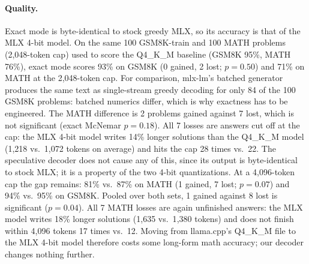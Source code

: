 \documentclass[11pt]{article}
\begin{document}
\paragraph{Quality.} Exact mode is byte-identical to stock greedy MLX, so its accuracy is that of the MLX 4-bit model. On the same 100 GSM8K-train and 100 MATH problems (2{,}048-token cap) used to score the Q4\_K\_M baseline (GSM8K 95\%, MATH 76\%), exact mode scores 93\% on GSM8K (0 gained, 2 lost; $p{=}0.50$) and 71\% on MATH at the 2{,}048-token cap.
For comparison, mlx-lm's batched generator produces the same text as single-stream greedy decoding for only 84 of the 100 GSM8K problems: batched numerics differ, which is why exactness has to be engineered.
The MATH difference is 2 problems gained against 7 lost, which is not significant (exact McNemar $p{=}0.18$).
All 7 losses are answers cut off at the cap: the MLX 4-bit model writes 14\% longer solutions than the Q4\_K\_M model (1{,}218 vs.\ 1{,}072 tokens on average) and hits the cap 28 times vs.\ 22.
The speculative decoder does not cause any of this, since its output is byte-identical to stock MLX; it is a property of the two 4-bit quantizations.
At a 4{,}096-token cap the gap remains: 81\% vs.\ 87\% on MATH (1 gained, 7 lost; $p{=}0.07$) and 94\% vs.\ 95\% on GSM8K. Pooled over both sets, 1 gained against 8 lost is significant ($p{=}0.04$). All 7 MATH losses are again unfinished answers: the MLX model writes 18\% longer solutions (1{,}635 vs.\ 1{,}380 tokens) and does not finish within 4{,}096 tokens 17 times vs.\ 12. Moving from llama.cpp's Q4\_K\_M file to the MLX 4-bit model therefore costs some long-form math accuracy; our decoder changes nothing further.
\end{document}
